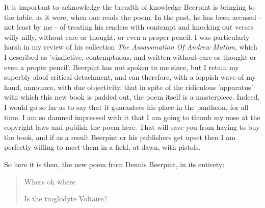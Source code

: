 It is important to acknowledge the breadth of knowledge Beerpint is bringing to the table, as it were, when one reads the poem. In the past, he has been accused - not least by me - of treating his readers with contempt and knocking out verses willy nilly, without care or thought, or even a proper pencil. I was particularly harsh in my review of his collection \emph{The Assassination Of Andrew Motion}, which I described as 'vindictive, contemptuous, and written without care or thought or even a proper pencil'. Beerpint has not spoken to me since, but I retain my superbly aloof critical detachment, and can therefore, with a foppish wave of my hand, announce, with due objectivity, that in spite of the ridiculous 'apparatus' with which this new book is padded out, the poem itself is a masterpiece. Indeed, I would go so far as to say that it guarantees his place in the pantheon, for all time. I am so damned impressed with it that I am going to thumb my nose at the copyright laws and publish the poem here. That will save you from having to buy the book, and if as a result Beerpint or his publishers get upset then I am perfectly willing to meet them in a field, at dawn, with pistols.

So here it is then, the new poem from Dennis Beerpint, in its entirety:

\begin{verse}
\begin{emph}
Where oh where

Is the troglodyte Voltaire?
\end{emph}
\end{verse}